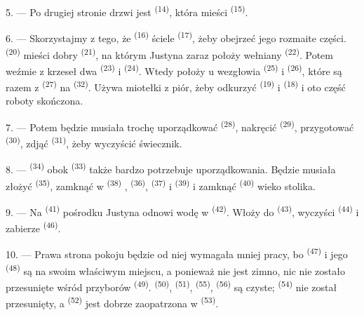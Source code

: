 5. --- Po drugiej stronie drzwi jest  \textsuperscript{(14)},
która mieści  \textsuperscript{(15)}.

6. --- Skorzystajmy z tego, że  \textsuperscript{(16)} ściele
 \textsuperscript{(17)}, żeby obejrzeć jego rozmaite części.
 \textsuperscript{(20)} mieści dobry 
\textsuperscript{(21)}, na którym Justyna zaraz położy wełniany 
\textsuperscript{(22)}. Potem weźmie z krzeseł dwa 
\textsuperscript{(23)} i  \textsuperscript{(24)}. Wtedy położy u wezgłowia
 \textsuperscript{(25)} i 
\textsuperscript{(26)}, które są razem z  \textsuperscript{(27)} na
 \textsuperscript{(32)}. Używa miotełki z piór, żeby
odkurzyć  \textsuperscript{(19)} i 
\textsuperscript{(18)} i oto część roboty skończona.

7. --- Potem będzie musiała trochę uporządkować 
\textsuperscript{(28)}, nakręcić  \textsuperscript{(29)}, przygotować
 \textsuperscript{(30)}, zdjąć 
\textsuperscript{(31)}, żeby wyczyścić świecznik.

\VUsaut{5.0mm}
\VUsaut{3.0mm}

8. ---  \textsuperscript{(34)} obok 
\textsuperscript{(33)} także bardzo potrzebuje uporządkowania. Będzie musiała złożyć
 \textsuperscript{(35)}, zamknąć w 
\textsuperscript{(38)} ,  \textsuperscript{(36)},
 \textsuperscript{(37)} i  \textsuperscript{(39)} i
zamknąć  \textsuperscript{(40)} wieko stolika.

9. --- Na  \textsuperscript{(41)} pośrodku Justyna odnowi
wodę w  \textsuperscript{(42)}. Włoży  do
 \textsuperscript{(43)}, wyczyści 
\textsuperscript{(44)} i zabierze  \textsuperscript{(46)}.

10. --- Prawa strona pokoju będzie od niej wymagała mniej pracy, bo 
\textsuperscript{(47)} i jego  \textsuperscript{(48)} są na swoim
właściwym miejscu, a ponieważ nie jest zimno, nic nie zostało przesunięte wśród przyborów
 \textsuperscript{(49)}.  \textsuperscript{(50)},
 \textsuperscript{(51)}, 
\textsuperscript{(55)},  \textsuperscript{(56)} są czyste;
 \textsuperscript{(54)} nie został przesunięty, a
 \textsuperscript{(52)} jest dobrze zaopatrzona w
 \textsuperscript{(53)}.

